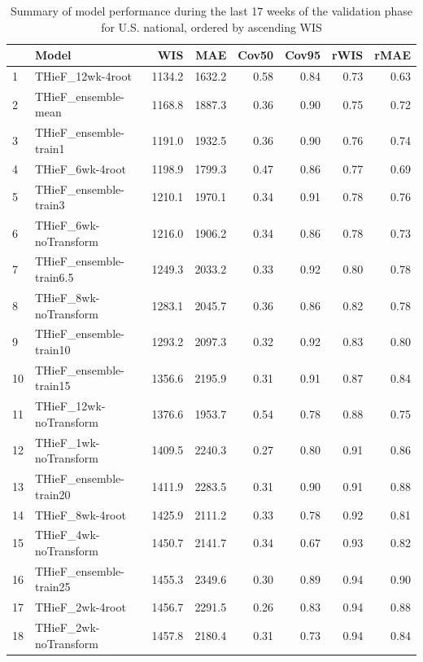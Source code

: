 \documentclass[thesis]{umassthesis}  %
\begin{document}
\begingroup\renewcommand{\arraystretch}{0.75}
\begin{longtable}{llrrrrrr}
\caption{Summary of model performance during the last 17 weeks of the validation phase for U.S. national, ordered by ascending WIS} \\ 
  \hline
 & Model & WIS & MAE & Cov50 & Cov95 & rWIS & rMAE \\ 
  \hline
1 & THieF\_12wk-4root & 1134.2 & 1632.2 & 0.58 & 0.84 & 0.73 & 0.63 \\ 
  2 & THieF\_ensemble-mean & 1168.8 & 1887.3 & 0.36 & 0.90 & 0.75 & 0.72 \\ 
  3 & THieF\_ensemble-train1 & 1191.0 & 1932.5 & 0.36 & 0.90 & 0.76 & 0.74 \\ 
  4 & THieF\_6wk-4root & 1198.9 & 1799.3 & 0.47 & 0.86 & 0.77 & 0.69 \\ 
  5 & THieF\_ensemble-train3 & 1210.1 & 1970.1 & 0.34 & 0.91 & 0.78 & 0.76 \\ 
  6 & THieF\_6wk-noTransform & 1216.0 & 1906.2 & 0.34 & 0.86 & 0.78 & 0.73 \\ 
  7 & THieF\_ensemble-train6.5 & 1249.3 & 2033.2 & 0.33 & 0.92 & 0.80 & 0.78 \\ 
  8 & THieF\_8wk-noTransform & 1283.1 & 2045.7 & 0.36 & 0.86 & 0.82 & 0.78 \\ 
  9 & THieF\_ensemble-train10 & 1293.2 & 2097.3 & 0.32 & 0.92 & 0.83 & 0.80 \\ 
  10 & THieF\_ensemble-train15 & 1356.6 & 2195.9 & 0.31 & 0.91 & 0.87 & 0.84 \\ 
  11 & THieF\_12wk-noTransform & 1376.6 & 1953.7 & 0.54 & 0.78 & 0.88 & 0.75 \\ 
  12 & THieF\_1wk-noTransform & 1409.5 & 2240.3 & 0.27 & 0.80 & 0.91 & 0.86 \\ 
  13 & THieF\_ensemble-train20 & 1411.9 & 2283.5 & 0.31 & 0.90 & 0.91 & 0.88 \\ 
  14 & THieF\_8wk-4root & 1425.9 & 2111.2 & 0.33 & 0.78 & 0.92 & 0.81 \\ 
  15 & THieF\_4wk-noTransform & 1450.7 & 2141.7 & 0.34 & 0.67 & 0.93 & 0.82 \\ 
  16 & THieF\_ensemble-train25 & 1455.3 & 2349.6 & 0.30 & 0.89 & 0.94 & 0.90 \\ 
  17 & THieF\_2wk-4root & 1456.7 & 2291.5 & 0.26 & 0.83 & 0.94 & 0.88 \\ 
  18 & THieF\_2wk-noTransform & 1457.8 & 2180.4 & 0.31 & 0.73 & 0.94 & 0.84 \\ 

\end{longtable}
\end{document}
